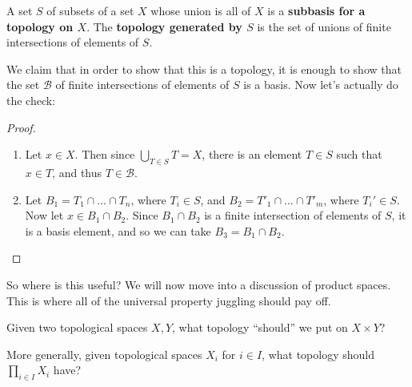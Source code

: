 \documentclass[12pt, twosided]{article}
\begin{document}
  \begin{df}
    A set \(S\) of subsets of a set \(X\) whose union is all of \(X\) is a \textbf{subbasis for a topology on \(X\)}. The \textbf{topology generated by \(S\)} is the set of unions of finite intersections of elements of \(S\).
  \end{df}

  We claim that in order to show that this is a topology, it is enough to show that the set \(\mathcal{B}\) of finite intersections of elements of \(S\) is a basis. Now let's actually do the check:

  \begin{proof}
    \begin{enumerate}
    \item Let \(x \in X\). Then since \(\bigcup_{T \in S} T = X\), there is an element \(T \in S\) such that \(x \in T\), and thus \(T \in \mathcal{B}\).
    \item Let \(B_1 = T_1 \cap \ldots \cap T_n\), where \(T_i \in S\), and \(B_2 = T\prime_1 \cap \ldots \cap T\prime_m\), where \(T_i\prime \in S\). Now let \(x \in B_1 \cap B_2\). Since \(B_1 \cap B_2\) is a finite intersection of elements of \(S\), it is a basis element, and so we can take \(B_3 = B_1 \cap B_2\).
    \end{enumerate}
  \end{proof}

  So where is this useful? We will now move into a discussion of product spaces. This is where all of the universal property juggling should pay off.

  \begin{ques}
    Given two topological spaces \(X, Y\), what topology ``should'' we put on \(X \times Y\)?

    More generally, given topological spaces \(X_i\) for \(i \in I\), what topology should \(\prod_{i \in I} X_i\) have?
  \end{ques}
\end{document}
